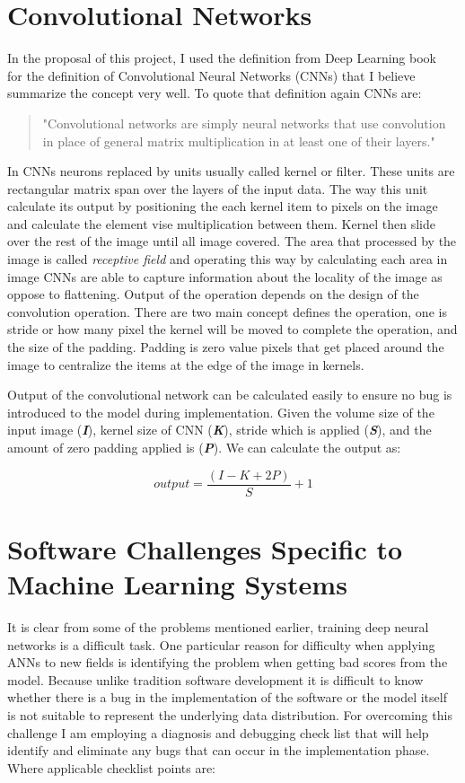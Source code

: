 \section{Convolutional Networks} \label{sec:convnets}
In the proposal of this project, I used the definition from Deep Learning book~\cite{deeplearningbook} for the definition of Convolutional Neural Networks (CNNs) that I believe summarize the concept very well. 
To quote that definition again CNNs are:
\begin{quote}
  "Convolutional networks are simply neural networks that use convolution in place of general matrix multiplication in at least one of their layers."
\end{quote}

In CNNs neurons replaced by units usually called kernel or filter.
These units are rectangular matrix span over the layers of the input data. 
The way this unit calculate its output by positioning the each kernel item to pixels on the image and calculate the element vise multiplication between them. 
Kernel then slide over the rest of the image until all image covered. 
The area that processed by the image is called \emph{receptive field} and operating this way by calculating each area in image CNNs are able to capture information about the locality of the image as oppose to flattening.
Output of the operation depends on the design of the convolution operation.
There are two main concept defines the operation, one is stride or how many pixel the kernel will be moved to complete the operation, and the size of the padding.
Padding is zero value pixels that get placed around the image to centralize the items at the edge of the image in kernels.

Output of the convolutional network can be calculated easily to ensure no bug is introduced to the model during implementation.
Given the volume size of the input image (\textbf{\textit{I}}), kernel size of CNN (\textbf{\textit{K}}), stride which is applied (\textbf{\textit{S}}), and the amount of zero padding applied is (\textbf{\textit{P}}). We can calculate the output as:

\begin{equation}
  output = \frac{(I - K + 2P)}{S} + 1  
\end{equation}

\section{Software Challenges Specific to 
Machine Learning Systems} \label{sec:engchallenge}
It is clear from some of the problems mentioned earlier, training deep neural networks is a difficult task. 
One particular reason for difficulty when applying ANNs to new fields is identifying the problem when getting bad scores from the model. 
Because unlike tradition software development it is difficult to know whether there is a bug in the implementation of the software or the model itself is not suitable to represent the underlying data distribution.
For overcoming this challenge I am employing a diagnosis and debugging check list that will help identify and eliminate any bugs that can occur in the implementation phase.
Where applicable checklist points are:

